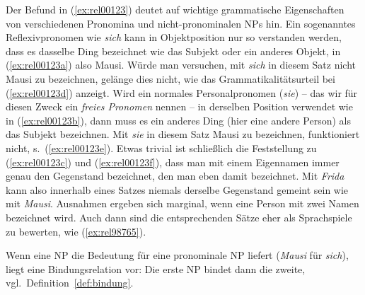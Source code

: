 \begin{exe}
  \ex\label{ex:rel00123} 
  \begin{xlist}
  \end{xlist}
\end{exe}

Der Befund in (\ref{ex:rel00123}) deutet auf wichtige grammatische Eigenschaften von verschiedenen Pronomina und nicht-pronominalen NPs hin.
Ein sogenanntes Reflexivpronomen wie \textit{sich} kann in Objektposition nur so verstanden werden, dass es dasselbe Ding bezeichnet wie das Subjekt oder ein anderes Objekt, in (\ref{ex:rel00123a}) also Mausi.
Würde man versuchen, mit \textit{sich} in diesem Satz nicht Mausi zu bezeichnen, gelänge dies nicht, wie das Grammatikalitätsurteil bei (\ref{ex:rel00123d}) anzeigt.
Wird ein normales Personalpronomen (\textit{sie}) -- das wir für diesen Zweck ein \textit{freies Pronomen} nennen -- in derselben Position verwendet wie in (\ref{ex:rel00123b}), dann muss es ein anderes Ding (hier eine andere Person) als das Subjekt bezeichnen.
Mit \textit{sie} in diesem Satz Mausi zu bezeichnen, funktioniert nicht, s.\ (\ref{ex:rel00123e}).
Etwas trivial ist schließlich die Feststellung zu (\ref{ex:rel00123c}) und (\ref{ex:rel00123f}), dass man \zB mit einem Eigennamen immer genau den Gegenstand bezeichnet, den man eben damit bezeichnet. 
Mit \textit{Frida} kann also innerhalb eines Satzes niemals derselbe Gegenstand gemeint sein wie mit \textit{Mausi}.
Ausnahmen ergeben sich marginal, wenn eine Person mit zwei Namen bezeichnet wird.
Auch dann sind die entsprechenden Sätze eher als Sprachspiele zu bewerten, wie \zB (\ref{ex:rel98765}).

\begin{exe}
\end{exe}

Wenn eine NP die Bedeutung für eine pronominale NP liefert (\zB \textit{Mausi} für \textit{sich}), liegt eine Bindungsrelation vor:
Die erste NP bindet dann die zweite, vgl.\ Definition~\ref{def:bindung}.


